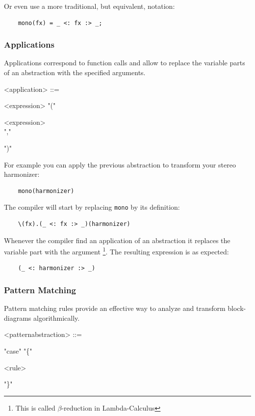 \documentclass[a4paper]{book}
\begin{document}
Or even use a more traditional, but equivalent, notation:
\begin{lstlisting}
	mono(fx) = _ <: fx :> _;
\end{lstlisting}


\subsubsection{Applications}
Applications correspond to function calls and allow to replace the variable parts of an abstraction with the specified arguments.

\begin{grammar}
  <application> ::= 
  \begin{syntdiag}
    <expression> "(" 
    \begin{rep}
      <expression> \\ ","
    \end{rep}
    ")"
  \end{syntdiag}
\end{grammar}

For example you can apply the previous abstraction to transform your stereo harmonizer:
\begin{lstlisting}
	mono(harmonizer)
\end{lstlisting}

The compiler will start by replacing \lstinline'mono' by its definition:
\begin{lstlisting}
	\(fx).(_ <: fx :> _)(harmonizer)
\end{lstlisting}

Whenever the \faust compiler find an application of an abstraction it replaces the variable part with the argument \footnote{This is called $\beta$-reduction in Lambda-Calculus}. The resulting expression is as expected:
\begin{lstlisting}
	(_ <: harmonizer :> _)
\end{lstlisting}



\subsubsection{Pattern Matching}
Pattern matching rules provide an effective way to analyze and transform block-diagrams algorithmically.

\begin{grammar}
  <patternabstraction> ::= 
  \begin{syntdiag} 
    "case" "\{"
    \begin{rep}
      <rule>
    \end{rep}
    "\}"
  \end{syntdiag}
\end{grammar}
\end{document}
